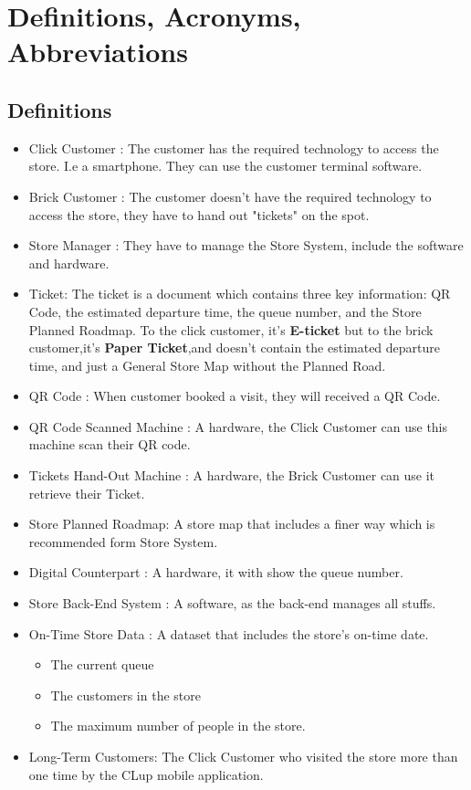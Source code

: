 \documentclass[a4paper,12pt]{report}
\begin{document}
\section{Definitions, Acronyms, Abbreviations}
\subsection{Definitions} \label{subsec:definitions}
\begin{itemize}
	\item Click Customer : The customer has the required technology to access the store.
							I.e a smartphone.
							They can use the customer terminal software.
	\item Brick Customer : The customer doesn't have the required technology to access the store, they have to hand out "tickets" on the spot.
	\item Store Manager : They have to manage the Store System, include the software and hardware.
	\item Ticket: The ticket is a document which contains three key information: QR Code, the estimated departure time, the queue number, and the Store Planned Roadmap.
					To the click customer, it's \textbf{E-ticket} but to the brick customer,it's \textbf{Paper Ticket},and doesn't contain the estimated departure time, and just a General Store Map without the Planned Road.
	\item QR Code : When customer booked a visit, they will received a QR Code.
	\item QR Code Scanned Machine : A hardware, the Click Customer can use this machine scan their QR code.
	\item Tickets Hand-Out Machine : A hardware, the Brick Customer can use it retrieve their Ticket.
	\item Store Planned Roadmap: A store map that includes a finer way which is recommended form Store System.
	\item Digital Counterpart : A hardware, it with show the queue number.
	\item Store Back-End System : A software, as the back-end manages all stuffs.
	\item On-Time Store Data : A dataset that includes the store's on-time date.
	\begin{itemize}
		\item The current queue
		\item The customers in the store
		\item The maximum number of people in the store.
	\end{itemize}
	\item Long-Term Customers: The Click Customer who visited the store more than one time by the CLup mobile application.
\end{itemize}
\end{document}
